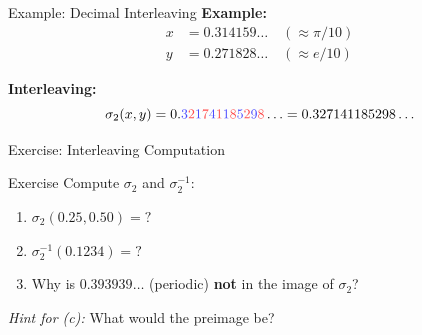 \documentclass[aspectratio=169]{beamer}
\begin{document}
\begin{frame}{Example: Decimal Interleaving}
\textbf{Example:}
\begin{align*}
x &= 0.314159\ldots \quad (\approx \pi/10) \\
y &= 0.271828\ldots \quad (\approx e/10)
\end{align*}

\textbf{Interleaving:}
\[
\sigma_2(x, y) = 0.\textcolor{blue!70}{3}\textcolor{red!70}{2}\textcolor{blue!70}{1}\textcolor{red!70}{7}\textcolor{blue!70}{4}\textcolor{red!70}{1}\textcolor{blue!70}{1}\textcolor{red!70}{8}\textcolor{blue!70}{5}\textcolor{red!70}{2}\textcolor{blue!70}{9}\textcolor{red!70}{8}\ldots = 0.327141185298\ldots
\]

\begin{center}
\end{center}
\end{frame}

\begin{frame}{Exercise: Interleaving Computation}
\begin{block}{Exercise}
Compute $\sigma_2$ and $\sigma_2^{-1}$:
\begin{enumerate}
    \item[(a)] $\sigma_2(0.25, 0.50) = ?$
    \item[(b)] $\sigma_2^{-1}(0.1234) = ?$
    \item[(c)] Why is $0.393939\ldots$ (periodic) \textbf{not} in the image of $\sigma_2$?
\end{enumerate}
\end{block}

\vspace{0.4cm}
\textit{Hint for (c):} What would the preimage be?
\end{frame}
\end{document}
